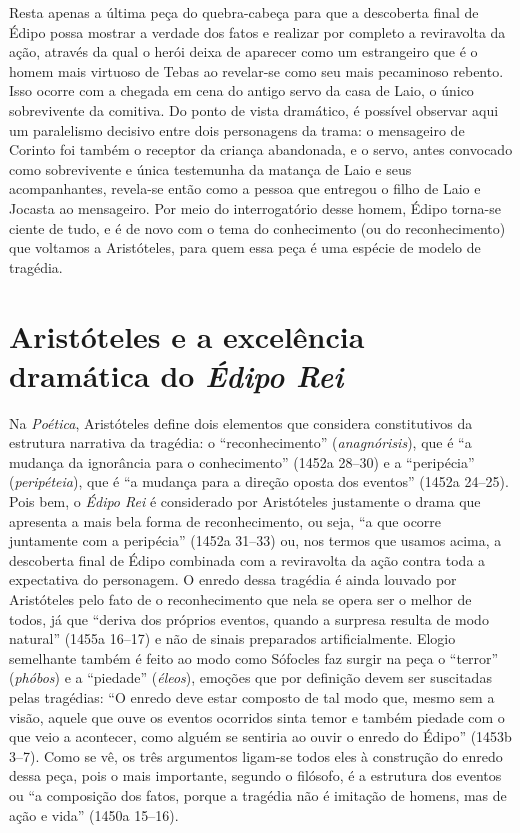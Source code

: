 Resta apenas a última peça do quebra-cabeça para que a descoberta final
de Édipo possa mostrar a verdade dos fatos e realizar por completo a
reviravolta da ação, através da qual o herói deixa de aparecer como um
estrangeiro que é o homem mais virtuoso de Tebas ao revelar-se como seu
mais pecaminoso rebento. Isso ocorre com a chegada em cena do antigo
servo da casa de Laio, o único sobrevivente da comitiva. Do ponto de
vista dramático, é possível observar aqui um paralelismo decisivo entre
dois personagens da trama: o mensageiro de Corinto foi também o receptor
da criança abandonada, e o servo, antes convocado como sobrevivente e
única testemunha da matança de Laio e seus acompanhantes, revela-se
então como a pessoa que entregou o filho de Laio e Jocasta ao
mensageiro. Por meio do interrogatório desse homem, Édipo torna-se
ciente de tudo, e é de novo com o tema do conhecimento (ou do
reconhecimento) que voltamos a Aristóteles, para quem essa peça é uma
espécie de modelo de tragédia.

\section{Aristóteles e a excelência dramática do \emph{Édipo Rei}}

Na \emph{Poética}, Aristóteles define dois elementos que considera
constitutivos da estrutura narrativa da tragédia: o ``reconhecimento''
(\emph{anagnórisis}), que é ``a mudança da ignorância para o
conhecimento'' (1452a 28--30) e a ``peripécia'' (\emph{peripéteia}), que
é ``a mudança para a direção oposta dos eventos'' (1452a 24--25). Pois
bem, o \emph{Édipo Rei} é considerado por Aristóteles justamente o drama
que apresenta a mais bela forma de reconhecimento, ou seja, ``a que
ocorre juntamente com a peripécia'' (1452a 31--33) ou, nos termos que
usamos acima, a descoberta final de Édipo combinada com a reviravolta da
ação contra toda a expectativa do personagem. O enredo dessa tragédia é
ainda louvado por Aristóteles pelo fato de o reconhecimento que nela se
opera ser o melhor de todos, já que ``deriva dos próprios eventos,
quando a surpresa resulta de modo natural'' (1455a 16--17) e não de
sinais preparados artificialmente. Elogio semelhante também é feito ao
modo como Sófocles faz surgir na peça o ``terror'' (\emph{phóbos}) e a
``piedade'' (\emph{éleos}), emoções que por definição devem ser
suscitadas pelas tragédias: ``O enredo deve estar composto de tal modo
que, mesmo sem a visão, aquele que ouve os eventos ocorridos sinta temor
e também piedade com o que veio a acontecer, como alguém se sentiria ao
ouvir o enredo do Édipo'' (1453b 3--7). Como se vê, os três argumentos
ligam-se todos eles à construção do enredo dessa peça, pois o mais
importante, segundo o filósofo, é a estrutura dos eventos ou ``a
composição dos fatos, porque a tragédia não é imitação de homens, mas de
ação e vida'' (1450a 15--16).

